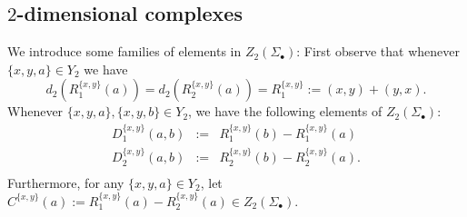 \documentclass[12pt]{amsart}
\theoremstyle{definition}
\newcommand{\<}{\langle}
\renewcommand{\>}{\rangle}
\begin{document}
\subsection{$2$-dimensional complexes}

We introduce some families of elements in $Z_2(\Sigma_\bullet)$:  First observe that whenever $\{ x,y,a\}\in Y_2$ we have \[
d_2(R_1^{\{ x,y\}}(a))=d_2(R_2^{\{ x,y\}}(a))=R_1^{\{ x,y\}}:= (x,y)+(y,x).
\]
Whenever $\{x,y,a\},\{x,y,b\}\in Y_2$, we have the following elements of  $Z_2(\Sigma_\bullet)$:
\begin{eqnarray*}
D_1^{\{ x,y\}}(a,b)&:=& R_1^{\{ x,y\}}(b)-R_1^{\{ x,y\}}(a)\\
D_2^{\{ x,y\}}(a,b)&:=& R_2^{\{ x,y\}}(b)-R_2^{\{ x,y\}}(a).\\
\end{eqnarray*}
Furthermore, for any $\{ x,y,a\}\in Y_2$, let $C^{\{ x,y\}}(a):=R_1^{\{ x,y\}}(a)-R_2^{\{ x,y\}}(a)\in Z_2(\Sigma_\bullet)$. 





\end{document}

